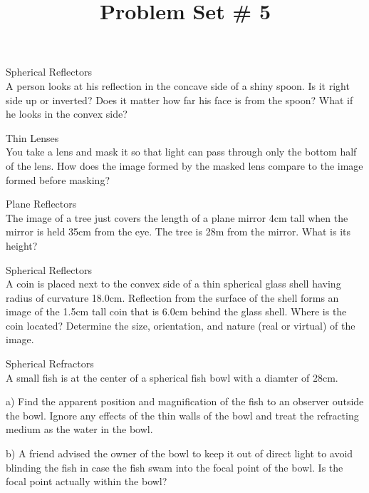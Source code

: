 \documentclass[10pt]{article}
\newenvironment{problem}[2][Problem]{\begin{trivlist}
\item[\hskip \labelsep {\bfseries #1}\hskip \labelsep {\bfseries #2.}]}{\end{trivlist}}
\begin{document}
 \title{Problem Set \# 5}
\date{}
\maketitle

\begin{problem}{1} Spherical Reflectors\\
A person looks at his reflection in the concave side of a shiny spoon. Is it right side up or inverted? Does it matter how far his face is from the spoon? What if he looks in the convex side?
\end{problem}

\begin{problem}{2} Thin Lenses\\
You take a lens and mask it so that light can pass through only the bottom half of the lens. How does the image formed by the masked lens compare to the image formed before masking?
\end{problem}

\begin{problem}{3} Plane Reflectors\\
The image of a tree just covers the length of a plane mirror 4cm tall when the mirror is held 35cm from the eye. The tree is 28m from the mirror. What is its height?
\end{problem}

\begin{problem}{4} Spherical Reflectors\\
A coin is placed next to the convex side of a thin spherical glass shell having radius of curvature 18.0cm. Reflection from the surface of the shell forms an image of the 1.5cm tall coin that is 6.0cm behind the glass shell. Where is the coin located? Determine the size, orientation, and nature (real or virtual) of the image.
\end{problem}

\begin{problem}{5} Spherical Refractors\\
A small fish is at the center of a spherical fish bowl with a diamter of 28cm.
\item a) Find the apparent position and magnification of the fish to an observer outside the bowl. Ignore any effects of the thin walls of the bowl and treat the refracting medium as the water in the bowl.
\item b) A friend advised the owner of the bowl to keep it out of direct light to avoid blinding the fish in case the fish swam into the focal point of the bowl. Is the focal point actually within the bowl?
\end{problem}
\end{document}
